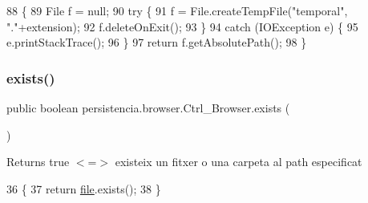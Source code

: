 \begin{DoxyCode}
88                                                           \{
89         File f = null;
90         \textcolor{keywordflow}{try} \{
91             f = File.createTempFile(\textcolor{stringliteral}{"temporal"}, \textcolor{stringliteral}{"."}+extension);
92             f.deleteOnExit();
93         \}
94         \textcolor{keywordflow}{catch} (IOException e) \{
95             e.printStackTrace();
96         \}
97         \textcolor{keywordflow}{return} f.getAbsolutePath();
98     \}
\end{DoxyCode}
\mbox{\label{classpersistencia_1_1browser_1_1Ctrl__Browser_ac79782a4f7fd5207498fe37e952f9b8b}} 
\subsubsection{\texorpdfstring{exists()}{exists()}}
{\footnotesize\ttfamily public boolean persistencia.\+browser.\+Ctrl\+\_\+\+Browser.\+exists (\begin{DoxyParamCaption}{ }\end{DoxyParamCaption})\hspace{0.3cm}{\ttfamily [inline]}}

\begin{DoxyReturn}{Returns}
true $<$=$>$ existeix un fitxer o una carpeta al path especificat 
\end{DoxyReturn}

\begin{DoxyCode}
36                             \{
37         \textcolor{keywordflow}{return} \hyperlink{classpersistencia_1_1browser_1_1Ctrl__Browser_a72c151aed575c0848f7dbb1609b373c8}{file}.exists();
38     \}
\end{DoxyCode}
\mbox{\label{classpersistencia_1_1browser_1_1Ctrl__Browser_abdabfef6639c93ac5dc64f569b5b1d36}} 
